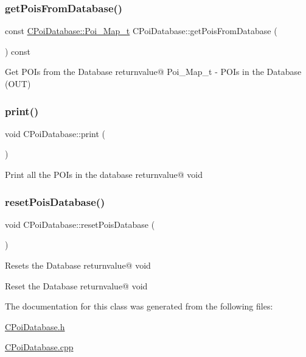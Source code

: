 \subsubsection{\texorpdfstring{get\+Pois\+From\+Database()}{getPoisFromDatabase()}}
{\footnotesize\ttfamily const \hyperlink{classCPoiDatabase_ad9ed38adc9bf4250e704cd3d378176a2}{C\+Poi\+Database\+::\+Poi\+\_\+\+Map\+\_\+t} C\+Poi\+Database\+::get\+Pois\+From\+Database (\begin{DoxyParamCaption}{ }\end{DoxyParamCaption}) const}

Get P\+O\+Is from the Database returnvalue@ Poi\+\_\+\+Map\+\_\+t -\/ P\+O\+Is in the Database (O\+UT) \mbox{\label{classCPoiDatabase_a540c1119ded65c6732fc92728c5b9c14}} 
\subsubsection{\texorpdfstring{print()}{print()}}
{\footnotesize\ttfamily void C\+Poi\+Database\+::print (\begin{DoxyParamCaption}{ }\end{DoxyParamCaption})}

Print all the P\+O\+Is in the database returnvalue@ void \mbox{\label{classCPoiDatabase_aab8efdfbd61515050fb1685d769cf5cd}} 
\subsubsection{\texorpdfstring{reset\+Pois\+Database()}{resetPoisDatabase()}}
{\footnotesize\ttfamily void C\+Poi\+Database\+::reset\+Pois\+Database (\begin{DoxyParamCaption}{ }\end{DoxyParamCaption})}

Resets the Database returnvalue@ void

Reset the Database returnvalue@ void 

The documentation for this class was generated from the following files\+:\begin{DoxyCompactItemize}
\item 
\hyperlink{CPoiDatabase_8h}{C\+Poi\+Database.\+h}\item 
\hyperlink{CPoiDatabase_8cpp}{C\+Poi\+Database.\+cpp}\end{DoxyCompactItemize}
